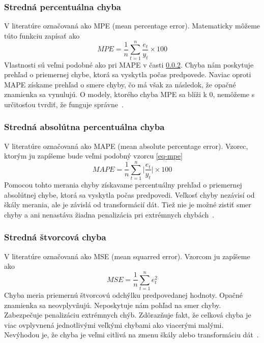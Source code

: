 \documentclass[a4paper,slovak,12pt,appendix]{article}
\begin{document}
\subsubsection{Stredná percentuálna chyba}
V literatúre označovaná ako MPE (mean percentage error). Matematicky môžeme
túto funkciu zapísať ako
\begin{equation}
  MPE = \frac{1}{n} \sum_{t=1}^{n} \frac{e_t}{y_t} \times 100
  \label{eq-mpe}
\end{equation}
Vlastnosti sú veľmi podobné ako pri MAPE v časti \ref{mape}. Chyba nám
poskytuje prehľad o priemernej chybe, ktorá sa vyskytla počas predpovede.
Naviac oproti MAPE získame prehľad o smere chyby, čo má však za následok, že
opačné znamienka sa vynulujú. O modely, ktorého chyba MPE sa blíži k 0,
nemôžeme s určitosťou tvrdiť, že funguje správne~\cite{Agrawal2013}.

\subsubsection{Stredná absolútna percentuálna chyba}
\label{mape}
V literatúre označovaná ako MAPE (mean absolute percentage error). Vzorec,
ktorým ju zapíšeme bude veľmi podobný vzorcu \ref{eq-mpe}
\begin{equation}
  MAPE = \frac{1}{n} \sum_{t=1}^{n} \Big|\frac{e_t}{y_t}\Big| \times 100
  \label{eq-mape}
\end{equation}
Pomocou tohto merania chyby získavame percentuálny prehľad o priemernej
absolútnej chybe, ktorá sa vyskytla počas predpovedi. Veľkosť chyby nezávisí od
škály merania, ale je závislá od transformácií dát. Tiež nie je možné zistiť
smer chyby a ani nenastáva žiadna penalizácia pri extrémnych
chybách~\cite{Agrawal2013}.

\subsubsection{Stredná štvorcová chyba}
V literatúre označovaná ako MSE (mean squarred error). Vzorcom ju zapíšeme ako
\begin{equation}
  MSE = \frac{1}{n} \sum_{t=1}^{n} e_t^2
  \label{eq-mse}
\end{equation}
Chyba meria priemernú štvorcovú odchýlku predpovedanej hodnoty. Opačné
znamienka sa neovplyvňujú. Neposkytuje nám pohľad na smer chyby. Zabezpečuje
penalizáciu extrémnych chýb. Zdôrazňuje fakt, že celková chyba je viac
ovplyvnená jednotlivými veľkými chybami ako viacerými malými. Nevýhodou je, že
chyba je veľmi citlivá na zmenu škály alebo transformáciu
dát~\cite{Agrawal2013}.
\end{document}
